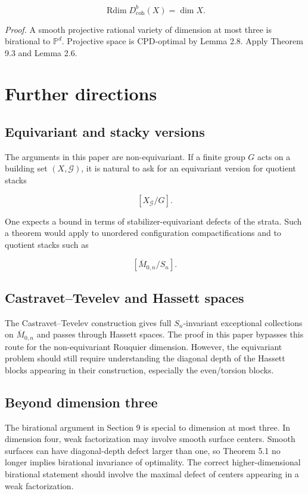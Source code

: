 \documentclass[11pt]{amsart}
\theoremstyle{definition}
\begin{document}
\[
\operatorname{Rdim}D^b_{\mathrm{coh}}(X)=\dim X.
\]

\noindent\emph{Proof.} A smooth projective rational variety of dimension at most three is birational to $\mathbb P^d$. Projective space is CPD-optimal by Lemma 2.8. Apply Theorem 9.3 and Lemma 2.6.

\section{Further directions}

\subsection{Equivariant and stacky versions}

The arguments in this paper are non-equivariant. If a finite group $G$ acts on a building set $(X,\mathcal G)$, it is natural to ask for an equivariant version for quotient stacks

\[
[X_{\mathcal G}/G].
\]

One expects a bound in terms of stabilizer-equivariant defects of the strata. Such a theorem would apply to unordered configuration compactifications and to quotient stacks such as

\[
[\overline M_{0,n}/S_n].
\]

\subsection{Castravet--Tevelev and Hassett spaces}

The Castravet--Tevelev construction gives full $S_n$-invariant exceptional collections on $\overline M_{0,n}$ and passes through Hassett spaces. The proof in this paper bypasses this route for the non-equivariant Rouquier dimension. However, the equivariant problem should still require understanding the diagonal depth of the Hassett blocks appearing in their construction, especially the even/torsion blocks.

\subsection{Beyond dimension three}

The birational argument in Section 9 is special to dimension at most three. In dimension four, weak factorization may involve smooth surface centers. Smooth surfaces can have diagonal-depth defect larger than one, so Theorem 5.1 no longer implies birational invariance of optimality. The correct higher-dimensional birational statement should involve the maximal defect of centers appearing in a weak factorization.
\end{document}
